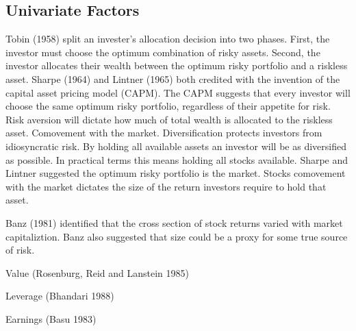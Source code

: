 \subsection{Univariate Factors}

Tobin (1958\cite{T58}) split an invester's allocation decision into two phases.
First, the investor must choose the optimum combination of risky assets.
Second, the investor allocates their wealth between the optimum risky portfolio
and a riskless asset.
Sharpe (1964\cite{S64}) and Lintner (1965\cite{L65}) both credited with the
invention of the capital asset pricing model (CAPM).
The CAPM suggests that every investor will choose the same optimum risky
portfolio, regardless of their appetite for risk. Risk aversion will dictate
how much of total wealth is allocated to the riskless asset.
Comovement with the market.
Diversification protects investors from idiosyncratic risk.
By holding all available assets an investor will be as diversified as possible.
In practical terms this means holding all stocks available.
Sharpe and Lintner suggested the optimum risky portfolio is the market.
Stocks comovement with the market dictates the size of the return investors
require to hold that asset.

Banz (1981\cite{B81}) identified that the cross section of stock returns varied
with market capitaliztion. Banz also suggested that size could be a proxy for
some true source of risk.

Value (Rosenburg, Reid and Lanstein 1985\cite{RRL85})

Leverage (Bhandari 1988\cite{B88})

Earnings (Basu 1983\cite{B83})